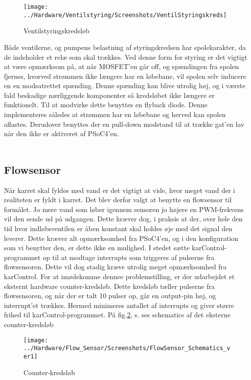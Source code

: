\begin{figure}[H]
	\centering
	\texttt{[image: ../Hardware/Ventilstyring/Screenshots/VentilStyringskreds]}
	\caption{Ventilstyringskredsløb}
	\label{screenshot:ventilStyringskreds}
\end{figure}

Både ventilerne, og pumpens belastning af styringskredsen har spolekarakter, da de indeholder et relæ som skal trækkes. Ved denne form for styring er det vigtigt at være opmærksom på, at når MOSFET'en går off, og spændingen fra spolen fjernes, hvorved strømmen ikke længere har en løbebane, vil spolen selv inducere en en modsatrettet spænding. Denne spænding kan blive utrolig høj, og i værste fald beskadige nærliggende komponenter så kredsløbet ikke længere er funktionelt.\newline 
Til at modvirke dette benyttes en flyback diode. Denne implementeres således at strømmen har en løbebane og herved kan spolen aflastes. Derudover benyttes der en pull-down modstand til at trække gat'en lav når den ikke er aktiveret af PSoC4'en.\\\


\subsection{Flowsensor}
Når karret skal fyldes med vand er det vigtigt at vide, hvor meget vand der i realiteten er fyldt i karret. Det blev derfor valgt at benytte en flowsensor til formålet. Jo mere vand som løber igennem sensoren jo højere en PWM-frekvens vil den sende ud på udgangen. Dette kræver dog, i praksis at der, over hele den tid hvor indløbsventilen er åben konstant skal holdes øje med det signal den leverer. Dette kræver alt opmærksomhed fra PSoC4'en, og i den konfiguration som vi benytter den, er dette ikke en mulighed.\newline
I stedet sætte karControl-programmet op til at modtage interrupts som triggeres af pulserne fra flowsensoren. Dette vil dog stadig kræve utrolig meget opmærksomhed fra karControl. For at imødekomme dennee problemstilling, er der udarbejdet et eksternt hardware counter-kredsløb. Dette kredsløb tæller pulserne fra flowsensoren, og når der er talt 10 pulser op, går en output-pin høj, og interrupt'et trækkes. Hermed minimeres antallet af interrupts og giver større frihed til karControl-programmet. På fig.\ref{screenshot:counter}, s.\pageref{screenshot:counter} ses schematics af det eksterne counter-kredsløb

\begin{figure}[H]
	\centering
	\texttt{[image: ../Hardware/Flow\_Sensor/Screenshots/FlowSensor\_Schematics\_ver1]}
	\caption{Counter-kredsløb}
	\label{screenshot:counter}
\end{figure}

